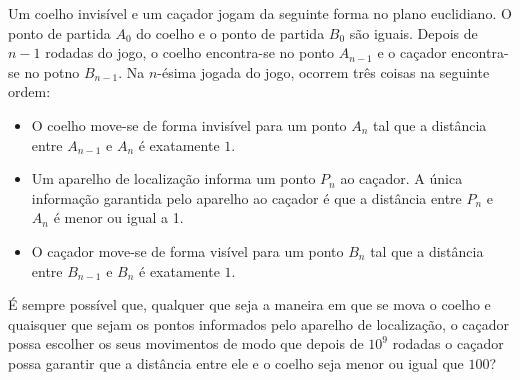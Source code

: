 Um coelho invisível e um caçador jogam da seguinte forma no plano euclidiano. O ponto de partida $A_0$ do coelho e o ponto de partida $B_0$ são iguais. Depois de $n-1$ rodadas do jogo, o coelho encontra-se no ponto $A_{n-1}$ e o caçador encontra-se no potno $B_{n-1}$. Na $n$-ésima jogada do jogo, ocorrem três coisas na seguinte ordem: 
\begin{itemize}
	\item O coelho move-se de forma invisível para um ponto $A_n$ tal que a distância entre $A_{n-1}$ e $A_n$ é exatamente $1$.
	\item Um aparelho de localização informa um ponto $P_n$ ao caçador. A única informação garantida pelo aparelho ao caçador é que a distância entre $P_n$ e $A_n$ é menor ou igual a 1.
	\item O caçador move-se de forma visível para um ponto $B_n$ tal que a distância entre $B_{n-1}$ e $B_n$ é exatamente $1$.
\end{itemize}

É sempre possível que, qualquer que seja a maneira em que se mova o coelho e quaisquer que sejam os pontos informados pelo aparelho de localização, o caçador possa escolher os seus movimentos de modo que depois de $10^9$ rodadas o caçador possa garantir que a distância entre ele e o coelho seja menor ou igual que $100$?
